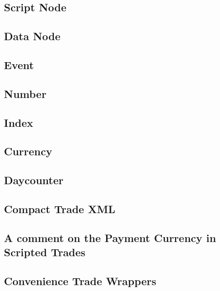 \documentclass[12pt, a4paper]{article}
\begin{document}
\subsection{Script Node}\label{scriptNode}


\subsection{Data Node}\label{dataNode}


\subsection{Event}\label{event}


\subsection{Number}


\subsection{Index}\label{data_index}


\subsection{Currency}


\subsection{Daycounter}


\subsection{Compact Trade XML}\label{compactXml}


\subsection{A comment on the Payment Currency in Scripted Trades}\label{sss:payccy_st}


\subsection{Convenience Trade Wrappers}

\end{document}
